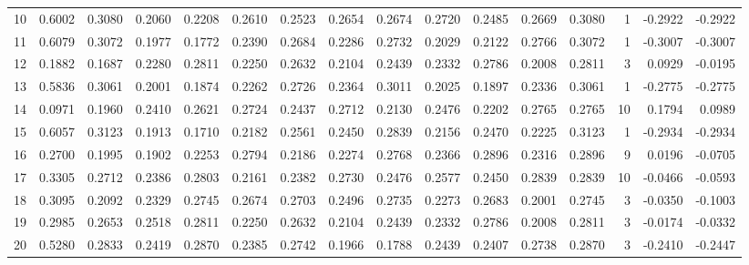 \begin{tabular}{lrrrrrrrrrrrrrrr}
10  &      0.6002 &  0.3080 &  0.2060 &  0.2208 &  0.2610 &  0.2523 &  0.2654 &  0.2674 &  0.2720 &  0.2485 &   0.2669 &     0.3080 &      1 &                   -0.2922 &                    -0.2922 \\
11  &      0.6079 &  0.3072 &  0.1977 &  0.1772 &  0.2390 &  0.2684 &  0.2286 &  0.2732 &  0.2029 &  0.2122 &   0.2766 &     0.3072 &      1 &                   -0.3007 &                    -0.3007 \\
12  &      0.1882 &  0.1687 &  0.2280 &  0.2811 &  0.2250 &  0.2632 &  0.2104 &  0.2439 &  0.2332 &  0.2786 &   0.2008 &     0.2811 &      3 &                    0.0929 &                    -0.0195 \\
13  &      0.5836 &  0.3061 &  0.2001 &  0.1874 &  0.2262 &  0.2726 &  0.2364 &  0.3011 &  0.2025 &  0.1897 &   0.2336 &     0.3061 &      1 &                   -0.2775 &                    -0.2775 \\
14  &      0.0971 &  0.1960 &  0.2410 &  0.2621 &  0.2724 &  0.2437 &  0.2712 &  0.2130 &  0.2476 &  0.2202 &   0.2765 &     0.2765 &     10 &                    0.1794 &                     0.0989 \\
15  &      0.6057 &  0.3123 &  0.1913 &  0.1710 &  0.2182 &  0.2561 &  0.2450 &  0.2839 &  0.2156 &  0.2470 &   0.2225 &     0.3123 &      1 &                   -0.2934 &                    -0.2934 \\
16  &      0.2700 &  0.1995 &  0.1902 &  0.2253 &  0.2794 &  0.2186 &  0.2274 &  0.2768 &  0.2366 &  0.2896 &   0.2316 &     0.2896 &      9 &                    0.0196 &                    -0.0705 \\
17  &      0.3305 &  0.2712 &  0.2386 &  0.2803 &  0.2161 &  0.2382 &  0.2730 &  0.2476 &  0.2577 &  0.2450 &   0.2839 &     0.2839 &     10 &                   -0.0466 &                    -0.0593 \\
18  &      0.3095 &  0.2092 &  0.2329 &  0.2745 &  0.2674 &  0.2703 &  0.2496 &  0.2735 &  0.2273 &  0.2683 &   0.2001 &     0.2745 &      3 &                   -0.0350 &                    -0.1003 \\
19  &      0.2985 &  0.2653 &  0.2518 &  0.2811 &  0.2250 &  0.2632 &  0.2104 &  0.2439 &  0.2332 &  0.2786 &   0.2008 &     0.2811 &      3 &                   -0.0174 &                    -0.0332 \\
20  &      0.5280 &  0.2833 &  0.2419 &  0.2870 &  0.2385 &  0.2742 &  0.1966 &  0.1788 &  0.2439 &  0.2407 &   0.2738 &     0.2870 &      3 &                   -0.2410 &                    -0.2447 \\

\end{tabular}
